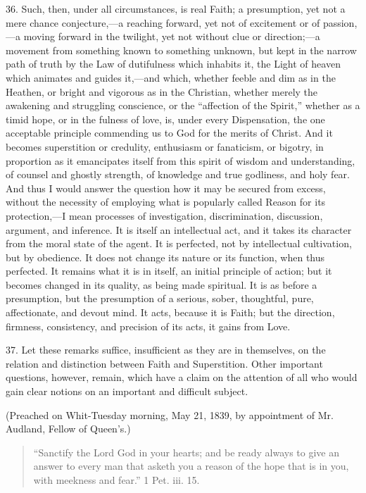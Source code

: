 36. Such, then, under all circumstances, is real Faith; a
presumption, yet not a mere chance conjecture,—a reaching forward,
yet not of excitement or of passion,—a moving forward in the
twilight, yet not without clue or direction;—a movement from
something known to something unknown, but kept in the narrow path of
truth by the Law of dutifulness which inhabits it, the Light of heaven
which animates and guides it,—and which, whether feeble and dim as
in the Heathen, or bright and vigorous as in the Christian, whether
merely the awakening and struggling conscience, or the ``affection
of the Spirit,'' whether as a timid hope, or in the fulness of
love, is, under every Dispensation, the one acceptable principle
commending us to God for the merits of Christ. And it becomes
superstition or credulity, enthusiasm or fanaticism, or bigotry, in
proportion as it emancipates itself from this spirit of wisdom and
understanding, of counsel and ghostly strength, of knowledge and true
godliness, and holy fear. And thus I would answer the question how it
may be secured from excess, without the necessity of employing what is
popularly called Reason for its protection,—I mean processes of
investigation, discrimination, discussion, argument, and inference. It
is itself an intellectual act, and it takes its character from the
moral state of the agent. It is perfected, not by intellectual
cultivation, but by obedience. It does not change its nature or its
function, when thus perfected. It remains what it is in itself, an
initial principle of action; but it becomes changed in its quality, as
being made spiritual. It is as before a presumption, but the
presumption of a serious, sober, thoughtful, pure, affectionate, and
devout mind. It acts, because it is Faith; but the direction,
firmness, consistency, and precision of its acts, it gains from Love.

37. Let these remarks suffice, insufficient as they are in
themselves, on the relation and distinction between Faith and
Superstition. Other important questions, however, remain, which have a
claim on the attention of all who would gain clear notions on an
important and difficult subject.

(Preached on Whit-Tuesday morning, May 21, 1839, by appointment of
Mr. Audland, Fellow of Queen's.)


\begin{quote}

``Sanctify the Lord God in your hearts; and be ready always
to give an answer to every man that asketh you a reason of the hope
that is in you, with meekness and fear.'' 1 Pet. iii. 15.

\end{quote}

